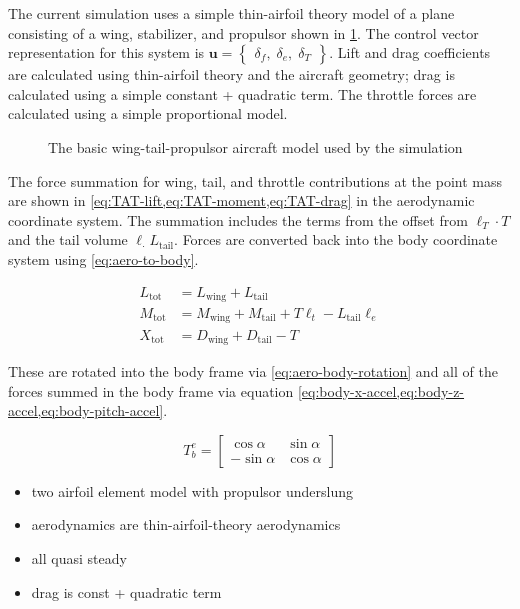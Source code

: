 \documentclass[]{article}
\begin{document}
	The current simulation uses a simple thin-airfoil theory model of a plane consisting of a wing, stabilizer, and propulsor shown in \cref{fig:TAT-model}. 
	The control vector representation for this system is $\mathbf{u} = \begin{Bmatrix} \delta_f,\; \delta_e,\; \delta_T \end{Bmatrix}$. 
	Lift and drag coefficients are calculated using thin-airfoil theory and the aircraft geometry; drag is calculated using a simple constant + quadratic term. 
	The throttle forces are calculated using a simple proportional model. 
	  \\
	\begin{figure}
		\centering
		\caption{The basic wing-tail-propulsor aircraft model used by the simulation} \label{fig:TAT-model}
	\end{figure}
	
	The force summation for wing, tail, and throttle contributions at the point mass are shown in \cref{eq:TAT-lift,eq:TAT-moment,eq:TAT-drag} in the aerodynamic coordinate system. 
	The summation includes the terms from the offset from $\ell_T \cdot T$ and the tail volume $\ell_ \cdot L_\mathrm{tail}$. 
	Forces are converted back into the body coordinate system using \cref{eq:aero-to-body}.
	
	 
	\begin{align}
		L_\mathrm{tot} &= L_\mathrm{wing} + L_\mathrm{tail} \label{eq:TAT-lift} \\
		M_\mathrm{tot} &= M_\mathrm{wing} + M_\mathrm{tail} + T \ell_t - L_\mathrm{tail} \ell_e \label{eq:TAT-moment} \\ 
		X_\mathrm{tot} &= D_\mathrm{wing} + D_\mathrm{tail} - T \label{eq:TAT-drag}
	\end{align}
	
	These are rotated into the body frame via \cref{eq:aero-body-rotation} and all of the forces summed in the body frame via equation \cref{eq:body-x-accel,eq:body-z-accel,eq:body-pitch-accel}.
	
	\begin{equation} \label{eq:aero-to-body}
		T_b^e = \begin{bmatrix}
			\cos{\alpha} & \sin{\alpha} \\
			-\sin{\alpha} & \cos{\alpha}
		\end{bmatrix}
	\end{equation}
	\begin{itemize}
		\item two airfoil element model with propulsor underslung
		\item aerodynamics are thin-airfoil-theory aerodynamics
		\item all quasi steady
		\item drag is const + quadratic term
	\end{itemize}
	
\end{document}
